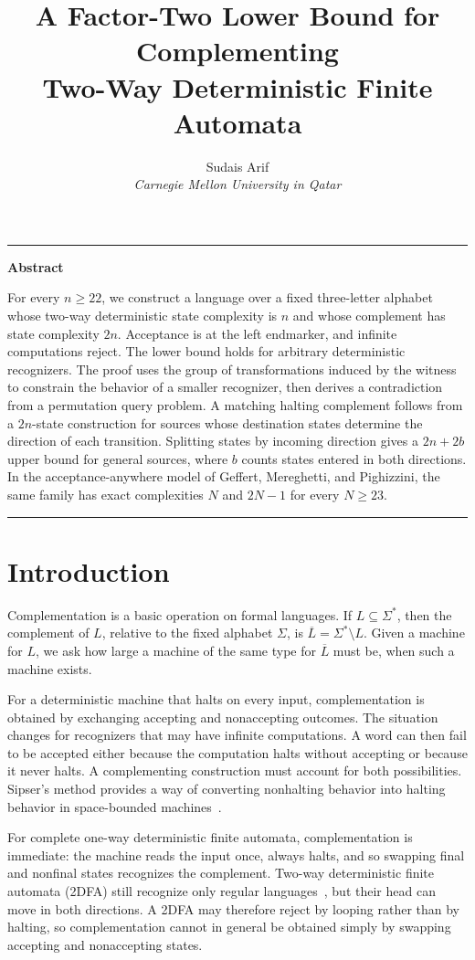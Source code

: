 \documentclass[11pt,a4paper]{article}
\title{A Factor-Two Lower Bound for Complementing\\Two-Way Deterministic Finite Automata}
\author{Sudais Arif\\[.3em]\small\itshape Carnegie Mellon University in Qatar}
\date{}
\theoremstyle{definition}
\theoremstyle{remark}
\renewenvironment{abstract}
 {\par\noindent\rule{\linewidth}{.4pt}\par\smallskip
  \noindent\textbf{Abstract}\par\smallskip\noindent\ignorespaces}
 {\par\smallskip\noindent\rule{\linewidth}{.4pt}\par\medskip}
\begin{document}
\maketitle
\thispagestyle{empty}

\begin{abstract}
For every $n\ge22$, we construct a language over a fixed three-letter
alphabet whose two-way deterministic state complexity is $n$ and whose
complement has state complexity $2n$. Acceptance is at the left
endmarker, and infinite computations reject. The lower bound holds
for arbitrary deterministic recognizers. The proof uses the group of
transformations induced by the witness to constrain the behavior of a
smaller recognizer, then derives a contradiction from a permutation
query problem. A matching halting complement follows from a
$2n$-state construction for sources whose destination states determine
the direction of each transition. Splitting states by incoming
direction gives a $2n+2b$ upper bound for general sources, where $b$
counts states entered in both directions. In the acceptance-anywhere
model of Geffert, Mereghetti, and Pighizzini, the same family has exact
complexities $N$ and $2N-1$ for every $N\ge23$.
\end{abstract}

\section{Introduction}\label{sec:intro}

Complementation is a basic operation on formal languages. If
$L\subseteq\Sigma^*$, then the complement of $L$, relative to the
fixed alphabet $\Sigma$, is $\overline L=\Sigma^*\setminus L$.
Given a machine for $L$, we ask how large a machine of the same type
for $\overline L$ must be, when such a machine exists.

For a deterministic machine that halts on every input, complementation
is obtained by exchanging accepting and nonaccepting outcomes. The
situation changes for recognizers that may have infinite computations.
A word can then fail to be accepted either because the computation
halts without accepting or because it never halts. A complementing
construction must account for both possibilities. Sipser's method
provides a way of converting nonhalting behavior into halting behavior
in space-bounded machines~\cite{Sipser1980}.

For complete one-way deterministic finite automata, complementation
is immediate: the machine reads the input once, always halts, and so
swapping final and nonfinal states recognizes the complement. Two-way
deterministic finite automata (2DFA) still recognize only regular
languages~\cite{RabinScott1959,Shepherdson1959}, but their head can
move in both directions. A 2DFA may therefore reject by looping rather
than by halting, so complementation cannot in general be obtained
simply by swapping accepting and nonaccepting states.
\end{document}
